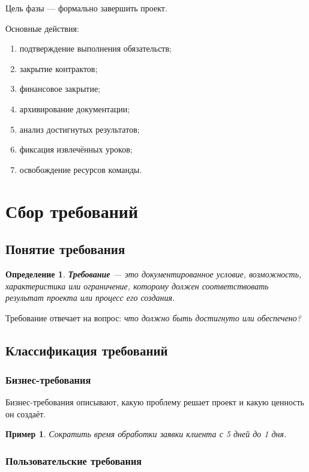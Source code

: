 \documentclass[12pt,a4paper]{article}
\newtheorem{definition}{Определение}
\newtheorem{example}{Пример}
\begin{document}
Цель фазы --- формально завершить проект.

Основные действия:
\begin{enumerate}
    \item подтверждение выполнения обязательств;
    \item закрытие контрактов;
    \item финансовое закрытие;
    \item архивирование документации;
    \item анализ достигнутых результатов;
    \item фиксация извлечённых уроков;
    \item освобождение ресурсов команды.
\end{enumerate}

\section{Сбор требований}

\subsection{Понятие требования}

\begin{definition}
\textbf{Требование} --- это документированное условие, возможность, характеристика или ограничение, которому должен соответствовать результат проекта или процесс его создания.
\end{definition}

Требование отвечает на вопрос: \textit{что должно быть достигнуто или обеспечено?}

\subsection{Классификация требований}

\subsubsection{Бизнес-требования}

Бизнес-требования описывают, какую проблему решает проект и какую ценность он создаёт.

\begin{example}
Сократить время обработки заявки клиента с 5 дней до 1 дня.
\end{example}

\subsubsection{Пользовательские требования}
\end{document}
